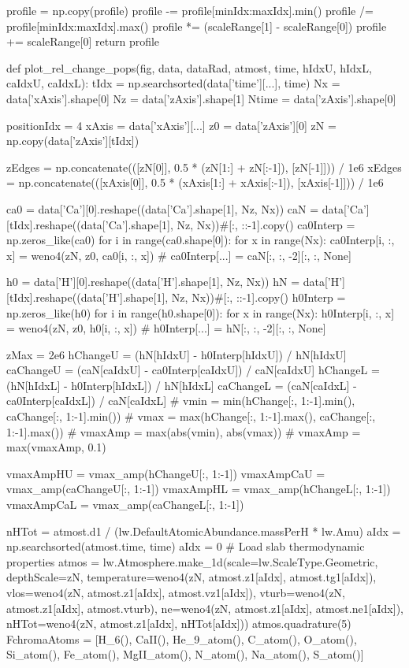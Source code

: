 \begin{pycode}[2DRT]
    profile = np.copy(profile)
    profile -= profile[minIdx:maxIdx].min()
    profile /= profile[minIdx:maxIdx].max()
    profile *= (scaleRange[1] - scaleRange[0])
    profile += scaleRange[0]
    return profile


def plot_rel_change_pops(fig, data, dataRad, atmost, time, hIdxU, hIdxL, caIdxU, caIdxL):
    tIdx = np.searchsorted(data['time'][...], time)
    Nx = data['xAxis'].shape[0]
    Nz = data['zAxis'].shape[1]
    Ntime = data['zAxis'].shape[0]

    positionIdx = 4
    xAxis = data['xAxis'][...]
    z0 = data['zAxis'][0]
    zN = np.copy(data['zAxis'][tIdx])

    zEdges = np.concatenate(([zN[0]], 0.5 * (zN[1:] + zN[:-1]), [zN[-1]])) / 1e6
    xEdges = np.concatenate(([xAxis[0]], 0.5 * (xAxis[1:] + xAxis[:-1]), [xAxis[-1]])) / 1e6

    ca0 = data['Ca'][0].reshape((data['Ca'].shape[1], Nz, Nx))
    caN = data['Ca'][tIdx].reshape((data['Ca'].shape[1], Nz, Nx))#[:, ::-1].copy()
    ca0Interp = np.zeros_like(ca0)
    for i in range(ca0.shape[0]):
        for x in range(Nx):
            ca0Interp[i, :, x] = weno4(zN, z0, ca0[i, :, x])
#     ca0Interp[...] = caN[:, :, -2][:, :, None]

    h0 = data['H'][0].reshape((data['H'].shape[1], Nz, Nx))
    hN = data['H'][tIdx].reshape((data['H'].shape[1], Nz, Nx))#[:, ::-1].copy()
    h0Interp = np.zeros_like(h0)
    for i in range(h0.shape[0]):
        for x in range(Nx):
            h0Interp[i, :, x] = weno4(zN, z0, h0[i, :, x])
#     h0Interp[...] = hN[:, :, -2][:, :, None]


    zMax = 2e6
    hChangeU = (hN[hIdxU] - h0Interp[hIdxU]) / hN[hIdxU]
    caChangeU = (caN[caIdxU] - ca0Interp[caIdxU]) / caN[caIdxU]
    hChangeL = (hN[hIdxL] - h0Interp[hIdxL]) / hN[hIdxL]
    caChangeL = (caN[caIdxL] - ca0Interp[caIdxL]) / caN[caIdxL]
#     vmin = min(hChange[:, 1:-1].min(), caChange[:, 1:-1].min())
#     vmax = max(hChange[:, 1:-1].max(), caChange[:, 1:-1].max())
#     vmaxAmp = max(abs(vmin), abs(vmax))
#     vmaxAmp = max(vmaxAmp, 0.1)

    vmaxAmpHU = vmax_amp(hChangeU[:, 1:-1])
    vmaxAmpCaU = vmax_amp(caChangeU[:, 1:-1])
    vmaxAmpHL = vmax_amp(hChangeL[:, 1:-1])
    vmaxAmpCaL = vmax_amp(caChangeL[:, 1:-1])

    nHTot = atmost.d1 / (lw.DefaultAtomicAbundance.massPerH * lw.Amu)
    aIdx = np.searchsorted(atmost.time, time)
    aIdx = 0 # Load slab thermodynamic properties
    atmos = lw.Atmosphere.make_1d(scale=lw.ScaleType.Geometric, depthScale=zN,
                                  temperature=weno4(zN, atmost.z1[aIdx], atmost.tg1[aIdx]),
                                  vlos=weno4(zN, atmost.z1[aIdx], atmost.vz1[aIdx]),
                                  vturb=weno4(zN, atmost.z1[aIdx], atmost.vturb),
                                  ne=weno4(zN, atmost.z1[aIdx], atmost.ne1[aIdx]),
                                  nHTot=weno4(zN, atmost.z1[aIdx], nHTot[aIdx]))
    atmos.quadrature(5)
    FchromaAtoms = [H_6(), CaII(), He_9_atom(), C_atom(), O_atom(), Si_atom(), Fe_atom(),
                MgII_atom(), N_atom(), Na_atom(), S_atom()]


\end{pycode}
